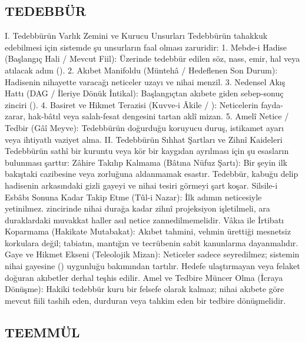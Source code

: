 \documentclass[11pt,a4paper]{article}
\begin{document}
\subsection{TEDEBBÜR}


I. Tedebbürün Varlık Zemini ve Kurucu Unsurları
Tedebbürün tahakkuk edebilmesi için sistemde şu unsurların faal olması zaruridir:
 1. Mebde-i Hadise (Başlangıç Hali / Mevcut Fiil): Üzerinde tedebbür edilen söz, nass, emir, hal veya atılacak adım ().
 2. Akıbet Manifoldu (Müntehâ / Hedeflenen Son Durum): Hadisenin nihayette varacağı neticeler uzayı ve nihai menzil.
 3. Nedensel Akış Hattı (DAG / İleriye Dönük İntikal): Başlangıçtan akıbete giden sebep-sonuç zinciri ().
 4. Basiret ve Hikmet Terazisi (Kuvve-i Âkile / ): Neticelerin fayda-zarar, hak-bâtıl veya salah-fesat dengesini tartan aklî mizan.
 5. Amelî Netice / Tedbir (Gâî Meyve): Tedebbürün doğurduğu koruyucu duruş, istikamet ayarı veya ihtiyatlı vaziyet alma.
II. Tedebbürün Sıhhat Şartları ve Zihnî Kaideleri
Tedebbürün sathî bir kuruntu veya kör bir kaygıdan ayrılması için şu esasların bulunması şarttır:
 Zâhire Takılıp Kalmama (Bâtına Nüfuz Şartı):
Bir şeyin ilk bakıştaki cazibesine veya zorluğuna aldanmamak esastır. Tedebbür, kabuğu delip hadisenin arkasındaki gizli gayeyi ve nihai tesiri görmeyi şart koşar.
 Silsile-i Esbâbı Sonuna Kadar Takip Etme (Tûl-i Nazar):
İlk adımın neticesiyle yetinilmez.  zincirinde nihai durağa kadar zihnî projeksiyon işletilmeli, ara duraklardaki muvakkat haller asıl netice zannedilmemelidir.
 Vâkıa ile İrtibatı Koparmama (Hakikate Mutabakat):
Akıbet tahmini, vehmin ürettiği mesnetsiz korkulara değil; tabiatın, mantığın ve tecrübenin sabit kanunlarına dayanmalıdır.
 Gaye ve Hikmet Ekseni (Teleolojik Mizan):
Neticeler sadece seyredilmez; sistemin nihai gayesine () uygunluğu bakımından tartılır. Hedefe ulaştırmayan
 veya felaket doğuran akıbetler derhal teşhis edilir.
 Amel ve Tedbire Müncer Olma (İcraya Dönüşme):
Hakiki tedebbür kuru bir felsefe olarak kalmaz; nihai akıbete göre mevcut fiili tashih eden, durduran veya tahkim eden bir tedbire dönüşmelidir.



\subsection{TEEMMÜL}
\end{document}
